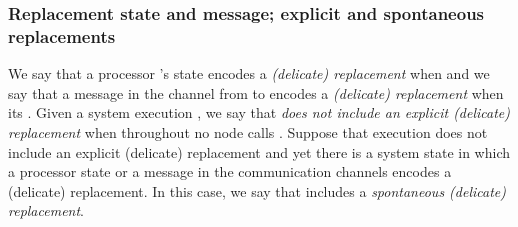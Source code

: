 \documentclass[11pt]{article}
\begin{document}
\subsubsection*{Replacement state and message; explicit and spontaneous replacements}
We say that a processor 's state encodes a \emph{(delicate) replacement} when  and we say that a message  in the channel from  to  encodes a \emph{(delicate) replacement} when its . 
Given a system execution , we say that  \emph{does not include an explicit (delicate) replacement} when throughout  no node  calls . Suppose that execution  does not include an explicit (delicate) replacement and yet there is a system state  in which a processor state or a message in the communication channels encodes a (delicate) replacement. In this case, we say that  includes a \emph{spontaneous (delicate) replacement}.
\end{document}
